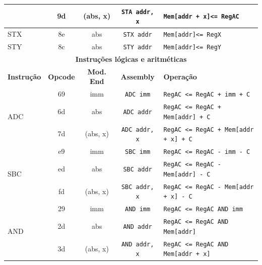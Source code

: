 \documentclass[
	12pt,				  %
	openright,		%
	a4paper,			%
	english,			%
	french,				%
	spanish,			%
	brazil,				%
]{abntex2}
\newcommand{\codenobg}[1]{\texttt{#1}}
\begin{document}
\begin{center}
\begin{longtable}{|l|c|c|c|p{7cm}|}
		                     & 9d              & (abs, x)          & \codenobg{STA addr, x} & \codenobg{Mem[addr + x]<= RegAC}                 \\ \hline
		\multirow{1}{*}{STX} & 8e              & abs               & \codenobg{STX addr}    & \codenobg{Mem[addr]<= RegX}                      \\ \hline
		\multirow{1}{*}{STY} & 8c              & abs               & \codenobg{STY addr}    & \codenobg{Mem[addr]<= RegY}                      \\ \hline
		\multicolumn{5}{|c|}{\textbf{Instruções lógicas e aritméticas}}                                                                        \\ \hline
		\textbf{Instrução}   & \textbf{Opcode} & \textbf{Mod. End} & \textbf{Assembly}      & \textbf{Operação}                                \\ \hline
		\multirow{3}{*}{ADC} & 69              & imm               & \codenobg{ADC imm}     & \codenobg{RegAC <= RegAC + imm + C}              \\ \cline{2-5}
		                     & 6d              & abs               & \codenobg{ADC addr}    & \codenobg{RegAC <= RegAC + Mem[addr] + C}        \\ \cline{2-5}
		                     & 7d              & (abs, x)          & \codenobg{ADC addr, x} & \codenobg{RegAC <= RegAC + Mem[addr + x] + C}    \\ \hline
		\multirow{3}{*}{SBC} & e9              & imm               & \codenobg{SBC imm}     & \codenobg{RegAC <= RegAC - imm - C}              \\ \cline{2-5}
		                     & ed              & abs               & \codenobg{SBC addr}    & \codenobg{RegAC <= RegAC - Mem[addr] - C}        \\ \cline{2-5}
		                     & fd              & (abs, x)          & \codenobg{SBC addr, x} & \codenobg{RegAC <= RegAC - Mem[addr + x] - C}    \\ \hline
		\multirow{3}{*}{AND} & 29              & imm               & \codenobg{AND imm}     & \codenobg{RegAC <= RegAC AND imm}                \\ \cline{2-5}
		                     & 2d              & abs               & \codenobg{AND addr}    & \codenobg{RegAC <= RegAC AND Mem[addr]}          \\ \cline{2-5}
		                     & 3d              & (abs, x)          & \codenobg{AND addr, x} & \codenobg{RegAC <= RegAC AND Mem[addr + x]}      \\ \hline

\end{longtable}
\end{center}
\end{document}
